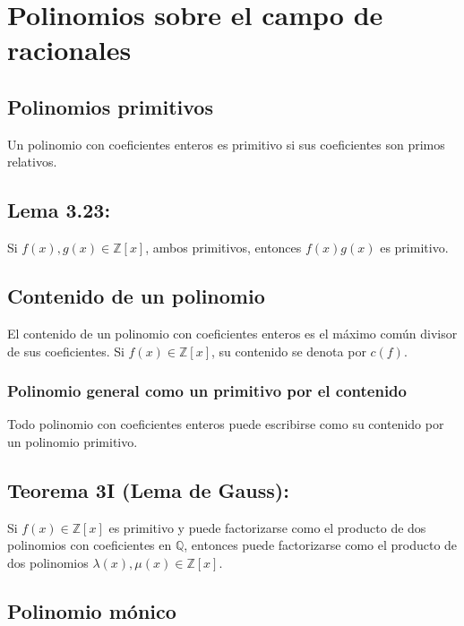 \documentclass{article}
\begin{document}
\newpage
\section{Polinomios sobre el campo de racionales}

\subsection*{\color{violet} Polinomios primitivos}

Un polinomio con coeficientes enteros es primitivo si sus coeficientes son primos relativos.

\subsection*{\color{blue} Lema 3.23:}

Si $f(x),g(x)\in\mathbb{Z}[x]$, ambos primitivos, entonces $f(x)g(x)$ es primitivo.

\subsection*{\color{violet} Contenido de un polinomio}

El contenido de un polinomio con coeficientes enteros es el máximo común divisor de sus coeficientes. Si $f(x)\in\mathbb{Z}[x]$, su contenido se denota por $c(f)$.

\subsubsection*{\color{purple} Polinomio general como un primitivo por el contenido}

Todo polinomio con coeficientes enteros puede escribirse como su contenido por un polinomio primitivo.

\subsection*{\color{red} Teorema 3I (Lema de Gauss):}

Si $f(x)\in\mathbb{Z}[x]$ es primitivo y puede factorizarse como el producto de dos polinomios con coeficientes en $\mathbb{Q}$, entonces puede factorizarse como el producto de dos polinomios $\lambda(x),\mu(x)\in\mathbb{Z}[x]$.

\subsection*{\color{violet} Polinomio mónico}
\end{document}
